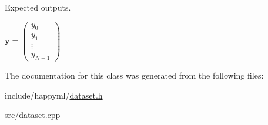 Expected outputs. 

$ \mathbf{y} = \begin{pmatrix} y_0 \\ y_1 \\ \vdots \\ y_{N - 1} \end{pmatrix} $ 

The documentation for this class was generated from the following files\+:\begin{DoxyCompactItemize}
\item 
include/happyml/\hyperlink{dataset_8h}{dataset.\+h}\item 
src/\hyperlink{dataset_8cpp}{dataset.\+cpp}\end{DoxyCompactItemize}
